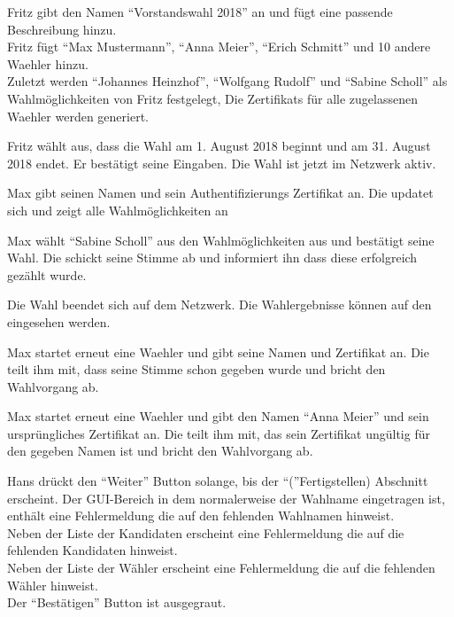 \documentclass[parskip=full,11pt,twoside]{scrartcl}
\begin{document}
		{Fritz gibt den Namen \enquote{Vorstandswahl 2018} an und fügt eine passende Beschreibung hinzu.\\
		Fritz fügt \enquote{Max Mustermann}, \enquote{Anna Meier}, \enquote{Erich Schmitt} und 10 andere \gls{Waehler} hinzu.\\
		Zuletzt werden \enquote{Johannes Heinzhof}, \enquote{Wolfgang Rudolf} und \enquote{Sabine Scholl} als Wahlmöglichkeiten von Fritz festgelegt,}
		{Die \glspl{Zertifikat} für alle zugelassenen \gls{Waehler} werden generiert.}	
	
\teststep{}
		{Fritz wählt aus, dass die \gls{Wahl} am 1. August 2018 beginnt und am 31. August 2018 endet. Er bestätigt seine Eingaben.}
		{Die \gls{Wahl} ist jetzt im \gls{Netzwerk} aktiv.}

		{Max gibt seinen Namen und sein Authentifizierungs \gls{Zertifikat} an.}
		{Die  updatet sich und zeigt alle Wahlmöglichkeiten an}
		
\teststep{}
		{Max wählt \enquote{Sabine Scholl} aus den Wahlmöglichkeiten aus und bestätigt seine Wahl.}
		{Die  schickt seine \gls{Stimme} ab und informiert ihn dass diese erfolgreich gezählt wurde.}
		
		{Die \gls{Wahl} beendet sich auf dem \gls{Netzwerk}.}
		{Die Wahlergebnisse können auf den  eingesehen werden.}
		
		{Max startet erneut eine \gls{Waehler}  und gibt seine Namen und \gls{Zertifikat} an.}
		{Die  teilt ihm mit, dass seine \gls{Stimme} schon gegeben wurde und bricht den Wahlvorgang ab.}

\teststep{}
		{Max startet erneut eine \gls{Waehler}  und gibt den Namen \enquote{Anna Meier} und sein ursprüngliches \gls{Zertifikat} an.}
		{Die  teilt ihm mit, das sein \gls{Zertifikat} ungültig für den gegeben Namen ist und bricht den Wahlvorgang ab.}

		{Hans drückt den \enquote{Weiter} Button solange, bis der \enquote(Fertigstellen) Abschnitt erscheint.}
		{Der GUI-Bereich in dem normalerweise der Wahlname eingetragen ist, enthält eine Fehlermeldung die auf den fehlenden Wahlnamen hinweist.\\
		Neben der Liste der Kandidaten erscheint eine Fehlermeldung die auf die fehlenden Kandidaten hinweist.\\
		Neben der Liste der Wähler erscheint eine Fehlermeldung die auf die fehlenden Wähler hinweist.\\
		Der \enquote{Bestätigen} Button ist ausgegraut.}
\end{document}
